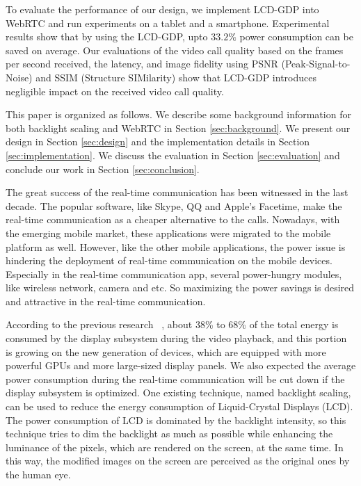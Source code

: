 To evaluate the performance of our design, we implement LCD-GDP into
WebRTC and run experiments on a tablet and a smartphone. Experimental
results show that by using the LCD-GDP, upto $33.2\%$ power
consumption can be saved on average. Our evaluations of the video call
quality based on the frames per second received, the latency, and
image fidelity using PSNR (Peak-Signal-to-Noise) and SSIM (Structure
SIMilarity) show that LCD-GDP introduces negligible impact on the
received video call quality.


This paper is organized as follows. We describe some background
information for both backlight scaling and WebRTC in Section
\ref{sec:background}. We present our design in Section
\ref{sec:design} and the implementation details in Section
\ref{sec:implementation}. We discuss the evaluation in Section
\ref{sec:evaluation} and conclude our work in Section
\ref{sec:conclusion}.

The great success of the real-time communication has been witnessed in
the last decade. The popular software, like Skype, QQ and Apple's
Facetime, make the real-time communication as a cheaper alternative to
the calls. Nowadays, with the emerging mobile market, these
applications were migrated to the mobile platform as well. However,
like the other mobile applications, the power issue is hindering the
deployment of real-time communication on the mobile
devices. Especially in the real-time communication app, several
power-hungry modules, like wireless network, camera and etc. So
maximizing the power savings is desired and attractive in the
real-time communication.


According to the previous research ~\cite{AG10}, about 38\% to 68\% of the
total energy is consumed by the display subsystem during the video
playback, and this portion is growing on the new generation of
devices, which are equipped with more powerful GPUs and more
large-sized display panels. We also expected the average power
consumption during the real-time communication will be cut down if the
display subsystem is optimized. One existing technique, named
backlight scaling, can be used to reduce the energy consumption of
Liquid-Crystal Displays (LCD). The power consumption of LCD is
dominated by the backlight intensity, so this technique tries to dim
the backlight as much as possible while enhancing the luminance of the
pixels, which are rendered on the screen, at the same time. In this
way, the modified images on the screen are perceived as the original
ones by the human eye.  


